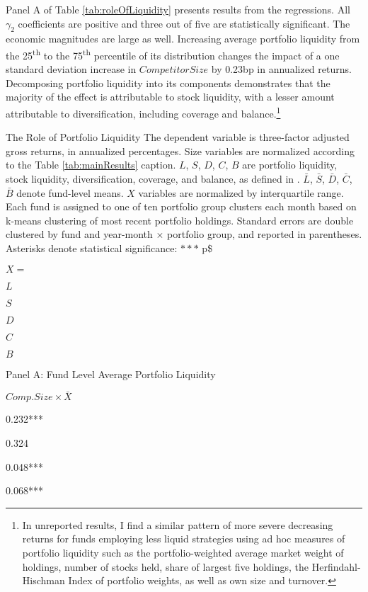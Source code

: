 \documentclass[]{book}
\let\rmarkdownfootnote\footnote%
\def\footnote{\protect\rmarkdownfootnote}
\theoremstyle{definition}
\theoremstyle{definition}
\theoremstyle{definition}
\theoremstyle{remark}
\begin{document}
Panel A of Table \ref{tab:roleOfLiquidity} presents results from the
regressions. All \(\gamma_2\) coefficients are positive and three out of
five are statistically significant. The economic magnitudes are large as
well. Increasing average portfolio liquidity from the
25\textsuperscript{th} to the 75\textsuperscript{th} percentile of its
distribution changes the impact of a one standard deviation increase in
\(CompetitorSize\) by 0.23bp in annualized returns. Decomposing
portfolio liquidity into its components demonstrates that the majority
of the effect is attributable to stock liquidity, with a lesser amount
attributable to diversification, including coverage and
balance.\footnote{In unreported results, I find a similar pattern of
  more severe decreasing returns for funds employing less liquid
  strategies using ad hoc measures of portfolio liquidity such as the
  portfolio-weighted average market weight of holdings, number of stocks
  held, share of largest five holdings, the Herfindahl-Hischman Index of
  portfolio weights, as well as own size and turnover.}

\label{tab:roleOfLiquidity}The Role of Portfolio Liquidity The dependent
variable is three-factor adjusted gross returns, in annualized
percentages. Size variables are normalized according to the Table
\ref{tab:mainResults} caption. \(L\), \(S\), \(D\), \(C\), \(B\) are
portfolio liquidity, stock liquidity, diversification, coverage, and
balance, as defined in \citet{pst17L}. \(\bar{L}\), \(\bar{S}\),
\(\bar{D}\), \(\bar{C}\), \(\bar{B}\) denote fund-level means. \(X\)
variables are normalized by interquartile range. Each fund is assigned
to one of ten portfolio group clusters each month based on k-means
clustering of most recent portfolio holdings. Standard errors are double
clustered by fund and year-month \(\times\) portfolio group, and
reported in parentheses. Asterisks denote statistical significance:
\(\ast\ast\ast\) p\$

\(X=\)

\(L\)

\(S\)

\(D\)

\(C\)

\(B\)

Panel A: Fund Level Average Portfolio Liquidity

\(Comp.Size \times \bar{X}\)

0.232***

0.324

0.048***

0.068***
\end{document}
